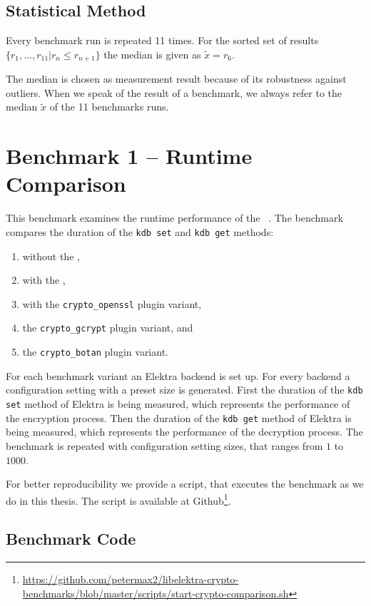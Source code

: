   \subsection{Statistical Method}

Every benchmark run is repeated 11 times.
For the sorted set of results $\{r_{1},...,r_{11} | r_n \leq r_{n+1}\}$ the median is given as $\tilde{x}=r_6$.

The median is chosen as measurement result because of its robustness against outliers.
When we speak of the result of a benchmark, we always refer to the median $\tilde{x}$ of the 11 benchmarks runs.

\section{Benchmark 1 -- Runtime Comparison}

This benchmark examines the runtime performance of the \crypto ~.
The benchmark compares the duration of the \texttt{kdb set} and \texttt{kdb get} methods:

\begin{enumerate}
\item without the \crypto ,
\item with the \fcrypt ,
\item with the \texttt{crypto\_openssl} plugin variant,
\item the \texttt{crypto\_gcrypt} plugin variant, and 
\item the \texttt{crypto\_botan} plugin variant.
\end{enumerate}

For each benchmark variant an Elektra backend is set up.
For every backend a configuration setting with a preset size is generated.
First the duration of the \texttt{kdb set} method of Elektra is being measured, which represents the performance of the encryption process.
Then the duration of the \texttt{kdb get} method of Elektra is being measured, which represents the performance of the decryption process.
The benchmark is repeated with configuration setting sizes, that ranges from $1$ to $1000$.

For better reproducibility we provide a script, that executes the benchmark as we do in this thesis.
The script is available at Github\footnote{\url{https://github.com/petermax2/libelektra-crypto-benchmarks/blob/master/scripts/start-crypto-comparison.sh}}.

  \subsection{Benchmark Code}

